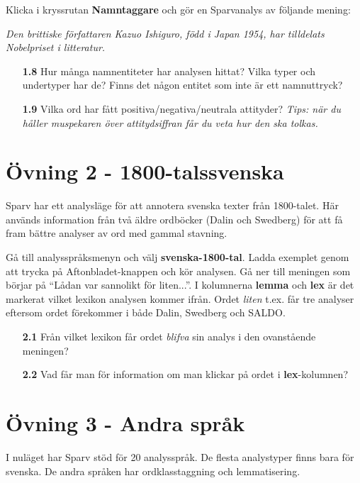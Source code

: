\documentclass[paper=a4, fontsize=12pt]{scrartcl} %
\numberwithin{equation}{section} %
\numberwithin{figure}{section} %
\numberwithin{table}{section} %
\begin{document}
\pagebreak
\noindent
Klicka i kryssrutan \textbf{Namntaggare} och gör en Sparvanalys av följande mening:

\begin{addmargin}[4em]{4em}
\textit{Den brittiske författaren Kazuo Ishiguro, född i Japan 1954, har tilldelats Nobelpriset i litteratur.}
\end{addmargin}

\begin{itemize}
    \item [\textbf{1.8}]
        Hur många namnentiteter har analysen hittat? Vilka typer och undertyper har de? Finns det någon entitet som inte är ett namnuttryck?

    \item [\textbf{1.9}]
        Vilka ord har fått positiva/negativa/neutrala attityder? 
        \textit{Tips: när du håller muspekaren över attitydsiffran 
        får du veta hur den ska tolkas.}
\end{itemize}

\section*{Övning 2 - 1800-talssvenska}
Sparv har ett analysläge för att annotera svenska texter från 1800-talet. Här används information från två äldre ordböcker (Dalin och Swedberg) för att få fram bättre analyser av ord med gammal stavning.

Gå till analysspråksmenyn och välj \textbf{svenska-1800-tal}. %
Ladda exemplet genom att trycka på Aftonbladet-knappen och kör analysen. Gå ner till meningen som börjar på ``Lådan var sannolikt för liten...''. I kolumnerna \textbf{lemma} och \textbf{lex} är det markerat vilket lexikon analysen kommer ifrån. Ordet \emph{liten} t.ex. får tre analyser eftersom ordet förekommer i både Dalin, Swedberg och SALDO.

\begin{itemize}
    \item [\textbf{2.1}] Från vilket lexikon får ordet \emph{blifva} sin analys i den ovanstående meningen?
    \item [\textbf{2.2}] Vad får man för information om man klickar på ordet i \textbf{lex}-kolumnen?
\end{itemize}

\section*{Övning 3 - Andra språk}
I nuläget har Sparv stöd för 20 analysspråk.
De flesta analystyper finns bara för svenska.
De andra språken har ordklasstaggning och lemmatisering.
\end{document}
